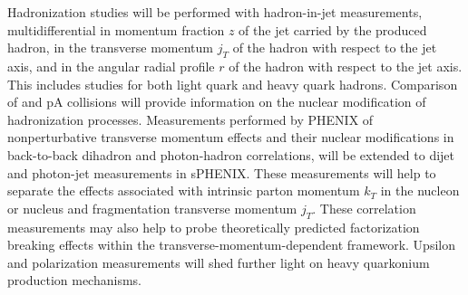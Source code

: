 Hadronization
studies will be performed with hadron-in-jet measurements,
multidifferential in momentum fraction $z$ of the jet carried by the
produced hadron, in the transverse momentum $j_T$ of the hadron with
respect to the jet axis, and in the angular radial profile $r$ of the
hadron with respect to the jet axis. This includes studies for both
light quark and heavy quark hadrons. Comparison of \pp and pA
collisions will provide information on the nuclear modification of
hadronization processes. Measurements performed by PHENIX of
nonperturbative transverse momentum effects and their nuclear
modifications in back-to-back dihadron and photon-hadron correlations,
will be extended to dijet and photon-jet measurements in sPHENIX.
These measurements will help to separate the effects associated with
intrinsic parton momentum $k_T$ in the nucleon or nucleus and
fragmentation transverse momentum $j_T$. These correlation
measurements may also help to probe theoretically predicted
factorization breaking effects within the
transverse-momentum-dependent framework. Upsilon and \jpsi
polarization measurements will shed further light on heavy quarkonium
production mechanisms. 
